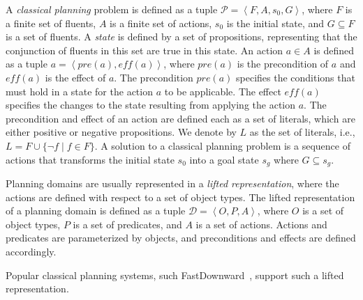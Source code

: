 \documentclass{article}
\theoremstyle{definition}
\theoremstyle{remark}
\newcommand{\tuple}[1]{\ensuremath{\left \langle #1 \right \rangle }}
\newif\ifaddcomments
\newcommand{\roni}[1]{\ifaddcomments{\textcolor{red}{[Roni: #1]}}\fi}
\newcommand{\pascalJr}[1]{\ifaddcomments{\textcolor{cyan}{[Pascal L.: {#1}]}}\fi}
\begin{document}
A \emph{classical planning} problem is defined as a tuple $\mathcal{P} = \tuple{F, A, s_0, G}$, where $F$ is a finite set of fluents, $A$ is a finite set of actions, $s_0$ is the initial state, and $G\subseteq F$ is a set of fluents. 
A \emph{state} is defined by a set of propositions, representing that the conjunction of fluents in this set are true in this state.
An action $a\in A$ is defined as a tuple $a = \tuple{\mathit{pre}(a), \mathit{eff}(a)}$, where $\mathit{pre}(a)$ is the precondition of $a$ and $\mathit{eff}(a)$ is the effect of $a$. 
The precondition $\mathit{pre}(a)$ specifies the conditions that must hold in a state for the action $a$ to be applicable. The effect $\mathit{eff}(a)$ specifies the changes to the state resulting from applying the action $a$.   
The precondition and effect of an action are defined each as a set of literals, which are either positive or negative propositions. We denote by $L$ as the set of literals, i.e., 
$L = F \cup \{\neg f \mid f\in F\}$.
A solution to a classical planning problem is a sequence of actions that transforms the initial state $s_0$ into a goal state $s_g$ where $G\subseteq s_g$. 


Planning domains are usually represented in a \emph{lifted representation}, where the actions are defined with respect to a set of object types.
The lifted representation of a planning domain is defined as a tuple $\mathcal{D} = \tuple{O, P, A}$, where $O$ is a set of object types, $P$ is a set of predicates, and $A$ is a set of actions. Actions and predicates are parameterized by objects, and preconditions and effects are defined accordingly.
\roni{I'm missing a sentence on what is a grounded action}
Popular classical planning systems, such FastDownward~\citep{helmert2006fast}, support such a lifted representation. 
\end{document}
